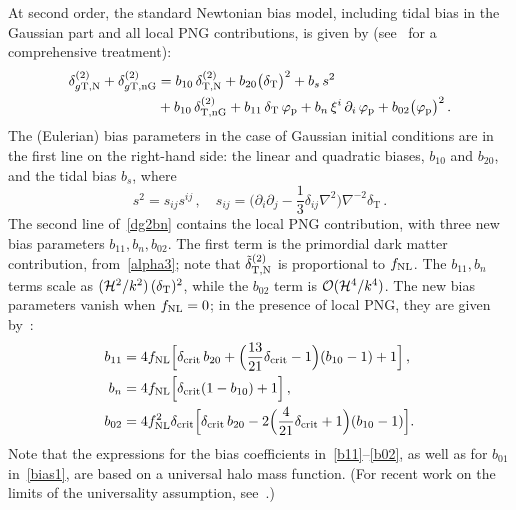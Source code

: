 {At second order, the standard Newtonian bias model, including tidal bias in the Gaussian part and all local PNG contributions, is given by (see~\cite{Desjacques:2016bnm} for a comprehensive treatment):
\begin{align}
\delta^{(2)}_{g{\mathrm{T,{N}}}} +\delta_{g\mathrm{T,nG}}^{(2)} &= b_{10}\, {\delta^{(2)}_{{\mathrm{T,{N}}}}}+ b_{20} \big(\delta_{{\mathrm{T}}}\big)^2   + b_s\,s^2 
\notag \\
& +b_{10}\, \delta_{\mathrm{T,nG}}^{(2)} + b_{11}\, \delta_{{\mathrm{T}}}\,\varphi_{\mathrm{p}} +  b_{{n}}\, \xi^i\,\partial_i\,\varphi_{\mathrm{p}}+b_{02} \big(\varphi_{\mathrm{p}}\big)^2\,. \label{dg2bn}
\end{align}
The (Eulerian) bias parameters in the case of Gaussian initial conditions are in the first line on the right-hand side:  the  linear and quadratic biases, $b_{10}$ and $b_{20}$, and the tidal bias $b_s$, where  
\begin{equation} \label{ts}
s^2=s_{ij}s^{ij}\,, \quad s_{ij} =\Big(\partial_i \partial_j - \frac{1}{3}\delta_{ij}\nabla^2 \Big){\nabla^{-2}\delta_{\mathrm{T}}} 
\,.
\end{equation}
The second line of~\eqref{dg2bn} contains the local PNG contribution, with three new bias parameters $b_{11}, b_{{n}}, b_{02}$. The first term is the {primordial dark matter contribution}, from~\eqref{alpha3}; note that $\tilde\delta^{(2)}_{{\mathrm{T,N}}}$ is proportional to $f_\text{NL}$.
{The $b_{11}, b_n$ terms scale as $(\mathcal{H}^2/k^2)\,(\delta_{\mathrm{T}})^2$, while the $b_{02}$ term is $\mathcal{O}(\mathcal{H}^4/k^4)$.}
 The new bias parameters vanish when $f_\text{NL}=0$; in the presence of local PNG, they are given by~\cite{Tellarini:2015faa, Desjacques:2016bnm,Umeh:2019jqg}: 
\begin{align}
b_{11} &= 4f_\text{NL} \Big[\delta_{\mathrm{crit}}\,b_{20}+\Big(\frac{13}{21}\delta_{\mathrm{crit}}-1 \Big) (b_{10}-1)+1\Big] 
\,, \label{b11}
\\
b_{{n}} &= 4f_\text{NL} \Big[ \delta_{\mathrm{crit}}(1-b_{10}) +1\Big] \,,  \label{bxi}
\\
b_{02} &= 4f_\text{NL}^2 \delta_{\mathrm{crit}}\Big[\delta_{\mathrm{crit}}\,b_{20}-2\Big( \frac{4}{21}\delta_{\mathrm{crit}}+1 \Big) (b_{10}-1)\Big]. \label{b02}
\end{align}
Note that the expressions for the bias coefficients in~\eqref{b11}--\eqref{b02}, as well as for $b_{01}$ in~\eqref{bias1}, are based on a universal halo mass function. {(For recent work on the limits of the universality assumption, see~\cite{Barreira:2020kvh,Barreira:2020ekm}.)} 
%
}
